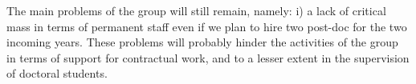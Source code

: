 The main problems of the group will still remain, namely: i) a lack of critical mass in terms of permanent staff even if we plan to hire two post-doc for the two incoming years.  These problems will probably hinder the activities of the group in terms of support for contractual work, and to a lesser extent in the supervision of doctoral students.






